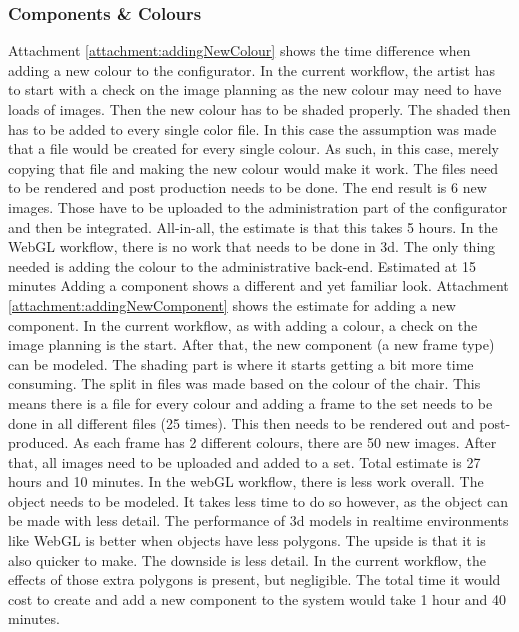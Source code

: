 \subsubsection{Components \& Colours}
Attachment \ref{attachment:addingNewColour} shows the time difference when adding a new colour to the configurator. In the current workflow, the artist has to start with a check on the image planning as the new colour may need to have loads of images. Then the new colour has to be shaded properly. The shaded then has to be added to every single color file. In this case the assumption was made that a file would be created for every single colour. As such, in this case, merely copying that file and making the new colour would make it work. The files need to be rendered and post production needs to be done. The end result is 6 new images. Those have to be uploaded to the administration part of the configurator and then be integrated. All-in-all, the estimate is that this takes 5 hours.\newline
In the WebGL workflow, there is no work that needs to be done in 3d. The only thing needed is adding the colour to the administrative back-end. Estimated at 15 minutes\newline
Adding a component shows a different and yet familiar look. Attachment \ref{attachment:addingNewComponent} shows the estimate for adding a new component. In the current workflow, as with adding a colour, a check on the image planning is the start. After that, the new component (a new frame type) can be modeled. The shading part is where it starts getting a bit more time consuming. The split in files was made based on the colour of the chair. This means there is a file for every colour and adding a frame to the set needs to be done in all different files (25 times). This then needs to be rendered out and post-produced. As each frame has 2 different colours, there are 50 new images. After that, all images need to be uploaded and added to a set. Total estimate is 27 hours and 10 minutes.
In the webGL workflow, there is less work overall. The object needs to be modeled. It takes less time to do so however, as the object can be made with less detail. The performance of 3d models in realtime environments like WebGL is better when objects have less polygons. The upside is that it is also quicker to make. The downside is less detail. In the current workflow, the effects of those extra polygons is present, but negligible. The total time it would cost to create and add a new component to the system would take 1 hour and 40 minutes.


